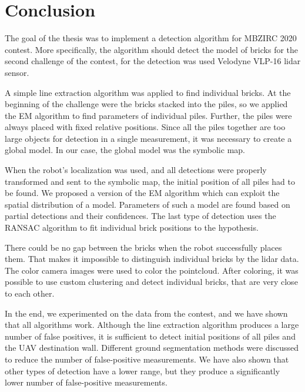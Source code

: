 \chapter{Conclusion}
\label{ch:conclusion}
The goal of the thesis was to implement a detection algorithm for MBZIRC 2020 contest. More specifically, the algorithm should detect the model of bricks for the second challenge of the contest, for the detection was used Velodyne VLP-16 lidar sensor. 

A simple line extraction algorithm was applied to find individual bricks. At the beginning of the challenge were the bricks stacked into the piles, so we applied the EM algorithm to find parameters of individual piles. Further, the piles were always placed with fixed relative positions. Since all the piles together are too large objects for detection in a single measurement, it was necessary to create a global model. In our case, the global model was the symbolic map.

When the robot's localization was used, and all detections were properly transformed and sent to the symbolic map, the initial position of all piles had to be found. We proposed a version of the EM algorithm which can exploit the spatial distribution of a model. Parameters of such a model are found based on partial detections and their confidences. The last type of detection uses the RANSAC algorithm to fit individual brick positions to the hypothesis.

There could be no gap between the bricks when the robot successfully places them. That makes it impossible to distinguish individual bricks by the lidar data. The color camera images were used to color the pointcloud. After coloring, it was possible to use custom clustering and detect individual bricks, that are very close to each other.

In the end, we experimented on the data from the contest, and we have shown that all algorithms work. Although the line extraction algorithm produces a large number of false positives, it is sufficient to detect initial positions of all piles and the UAV destination wall. Different ground segmentation methods were discussed to reduce the number of false-positive measurements. We have also shown that other types of detection have a lower range, but they produce a significantly lower number of false-positive measurements.